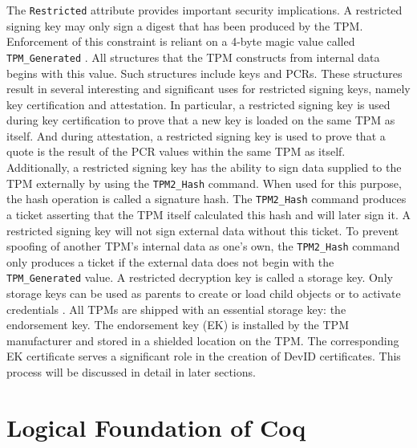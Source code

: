 The \verb|Restricted| attribute provides important security implications. A restricted signing key may only sign a digest that has been produced by the TPM. Enforcement of this constraint is reliant on a 4-byte magic value called \verb|TPM_Generated| \cite{TPMSpec}. All structures that the TPM constructs from internal data begins with this value. Such structures include keys and PCRs. These structures result in several interesting and significant uses for restricted signing keys, namely key certification and attestation. In particular, a restricted signing key is used during key certification to prove that a new key is loaded on the same TPM as itself. And during attestation, a restricted signing key is used to prove that a quote is the result of the PCR values within the same TPM as itself. Additionally, a restricted signing key has the ability to sign data supplied to the TPM externally by using the \verb|TPM2_Hash| command. When used for this purpose, the hash operation is called a signature hash. The \verb|TPM2_Hash| command produces a ticket asserting that the TPM itself calculated this hash and will later sign it. A restricted signing key will not sign external data without this ticket. To prevent spoofing of another TPM's internal data as one's own, the \verb|TPM2_Hash| command only produces a ticket if the external data does not begin with the \verb|TPM_Generated| value.
A restricted decryption key is called a storage key. Only storage keys can be used as parents to create or load child objects or to activate credentials \cite{PracticalGuide}. All TPMs are shipped with an essential storage key: the endorsement key. The endorsement key (EK) is installed by the TPM manufacturer and stored in a shielded location on the TPM. The corresponding EK certificate serves a significant role in the creation of DevID certificates. 
This process will be discussed in detail in later sections.







\vspace{2em}
\section{Logical Foundation of Coq}



